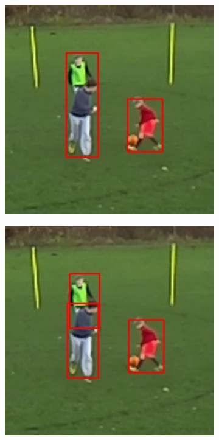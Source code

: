 \documentclass{article}
\begin{document}
\begin{figure}[h!]
  \begin{subfigure}[b]{0.5\linewidth}
  \centering
	\includegraphics[scale=0.4]{report/pic/3_new/off_seq_4.jpg} 
  \end{subfigure}
  \begin{subfigure}[b]{0.5\linewidth}
  \centering
	\includegraphics[scale=0.4]{report/pic/3_new/on_seq_4.jpg} 
  \end{subfigure}
    \begin{subfigure}[b]{0.5\linewidth}
  \centering

\end{subfigure}
\end{figure}
\end{document}
